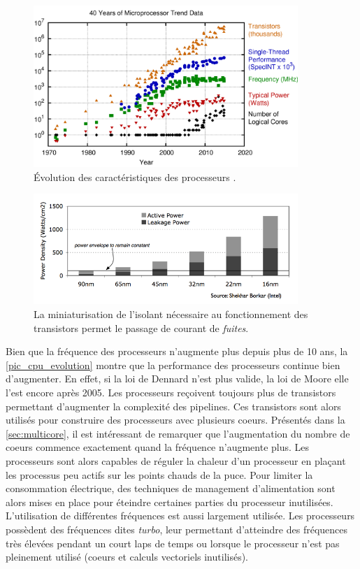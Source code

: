 \begin{figure}
    \center
    \includegraphics[width=10cm]{images/cpu_evolution.png}
    \caption{\label{pic_cpu_evolution} Évolution des caractéristiques des processeurs \cite{rupp40years}.}
\end{figure}

\begin{figure}
    \center
    \includegraphics[width=10cm]{images/cpu_leakage.png}
    \caption{\label{pic_cpu_leakage} La miniaturisation de l'isolant nécessaire au fonctionnement des transistors permet le passage de courant de \textit{fuites}.}
\end{figure}

Bien que la fréquence des processeurs n'augmente plus depuis plus de 10 ans, la \autoref{pic_cpu_evolution} montre que la performance des processeurs continue bien d'augmenter. En effet, si la loi de Dennard n'est plus valide, la loi de Moore elle l'est encore après 2005. Les processeurs reçoivent toujours plus de transistors permettant d'augmenter la complexité des pipelines. Ces transistors sont alors utilisés pour construire des processeurs avec plusieurs coeurs. Présentés dans la \autoref{sec:multicore}, il est intéressant de remarquer que l'augmentation du nombre de coeurs commence exactement quand la fréquence n'augmente plus. Les processeurs sont alors capables de réguler la chaleur d'un processeur en plaçant les processus peu actifs sur les points chauds de la puce.
Pour limiter la consommation électrique, des techniques de management d'alimentation sont alors mises en place pour éteindre certaines parties du processeur inutilisées.
L'utilisation de différentes fréquences est aussi largement utilisée. Les processeurs possèdent des fréquences dites \textit{turbo}, leur permettant d'atteindre des fréquences très élevées pendant un court laps de temps ou lorsque le processeur n'est pas pleinement utilisé (coeurs et calculs vectoriels inutilisés).




